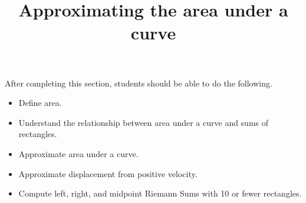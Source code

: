 \documentclass{ximera}
\title{Approximating the area under a curve}
\begin{document}
\begin{abstract}
\end{abstract}

\maketitle

\begin{sectionOutcomes}

After completing this section, students should be able to do the following.

\begin{itemize}
	\item Define area.
	\item Understand the relationship between area under a curve and sums of rectangles.
	\item Approximate area under a curve.
	\item Approximate displacement from positive velocity.
	\item Compute left, right, and midpoint Riemann Sums with 10 or fewer rectangles.
\end{itemize}

\end{sectionOutcomes}
\end{document}
